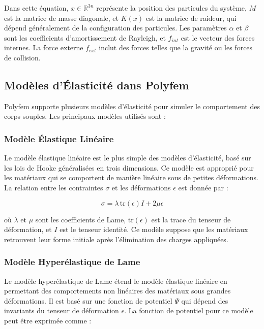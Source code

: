 Dans cette équation, \( x \in \mathbb{R}^{3n} \) représente la position des particules du système, \( M \) est la matrice de masse diagonale, et \( K(x) \) est la matrice de raideur, qui dépend généralement de la configuration des particules. Les paramètres \( \alpha \) et \( \beta \) sont les coefficients d’amortissement de Rayleigh, et \( f_{int} \) est le vecteur des forces internes. La force externe \( f_{ext} \) inclut des forces telles que la gravité ou les forces de collision.

\subsection{Modèles d'Élasticité dans Polyfem}

Polyfem supporte plusieurs modèles d’élasticité pour simuler le comportement des corps souples. Les principaux modèles utilisés sont :

\subsubsection{Modèle Élastique Linéaire}

Le modèle élastique linéaire est le plus simple des modèles d’élasticité, basé sur les lois de Hooke généralisées en trois dimensions. Ce modèle est approprié pour les matériaux qui se comportent de manière linéaire sous de petites déformations. La relation entre les contraintes \( \sigma \) et les déformations \( \epsilon \) est donnée par :

\[
\sigma = \lambda \, \text{tr}(\epsilon) I + 2\mu \epsilon
\]

où \( \lambda \) et \( \mu \) sont les coefficients de Lame, \( \text{tr}(\epsilon) \) est la trace du tenseur de déformation, et \( I \) est le tenseur identité. Ce modèle suppose que les matériaux retrouvent leur forme initiale après l’élimination des charges appliquées.

\subsubsection{Modèle Hyperélastique de Lame}

Le modèle hyperélastique de Lame étend le modèle élastique linéaire en permettant des comportements non linéaires des matériaux sous grandes déformations. Il est basé sur une fonction de potentiel \( \Psi \) qui dépend des invariants du tenseur de déformation \( \epsilon \). La fonction de potentiel pour ce modèle peut être exprimée comme :


